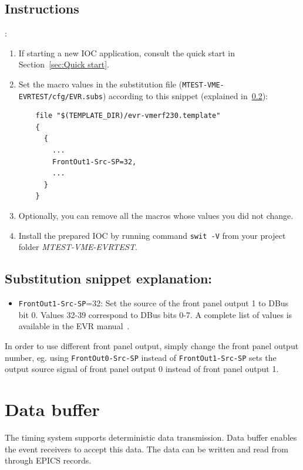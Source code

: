 \documentclass[12pt,a4paper]{article}
\begin{document}
\subsection{Instructions}:
\begin{enumerate}
	\item If starting a new IOC application, consult the quick start in Section~\ref{sec:Quick start}.
	
	\item Set the macro values in the substitution file (\texttt{MTEST-VME-EVRTEST/cfg/EVR.subs}) according to this snippet (explained in~\ref{sec:explain_dbus}):
\begin{verbatim}
	file "$(TEMPLATE_DIR)/evr-vmerf230.template"
	{
	  {
	    ...
	    FrontOut1-Src-SP=32,
	    ...
	  }
	}
\end{verbatim}

	\item Optionally, you can remove all the macros whose values you did not change. 
	\item Install the prepared IOC by running command \texttt{swit -V} from your project folder \textit{MTEST-VME-EVRTEST}.
\end{enumerate}

\subsection{Substitution snippet explanation:}\label{sec:explain_dbus}
\begin{itemize}
	\item \texttt{FrontOut1-Src-SP}=32: Set the source of the front panel output 1  to DBus bit 0. Values 32-39 correspond to DBus bits 0-7. A complete list of values is available in the EVR manual~\cite{evr_manual}.
\end{itemize}

In order to use different front panel output, simply change the front panel output number, eg. using \texttt{FrontOut0-Src-SP} instead of \texttt{FrontOut1-Src-SP} sets the output source signal of front panel output 0 instead of front panel output 1.

\section{Data buffer}\label{sec:data_buffer}
The timing system supports deterministic data transmission. Data buffer enables the event receivers to accept this data. The data can be written and read from through EPICS records.
\end{document}
